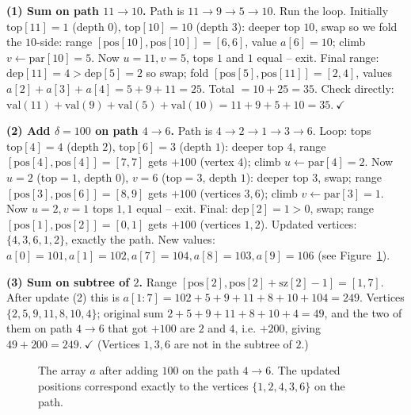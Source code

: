 \begin{labbox}
\textbf{(1) Sum on path $11\to 10$.} Path is $11\!\to\!9\!\to\!5\!\to\!10$. Run the loop. Initially
$\mathrm{top}[11]=1$ (depth $0$), $\mathrm{top}[10]=10$ (depth $3$): deeper top $10$, swap so we fold
the $10$-side: range $[\mathrm{pos}[10],\mathrm{pos}[10]]=[6,6]$, value $a[6]=10$; climb
$v\gets\mathrm{par}[10]=5$. Now $u=11,v=5$, tops $1$ and $1$ equal -- exit. Final range:
$\mathrm{dep}[11]=4>\mathrm{dep}[5]=2$ so swap; fold $[\mathrm{pos}[5],\mathrm{pos}[11]]=[2,4]$,
values $a[2]+a[3]+a[4]=5+9+11=25$. Total $=10+25=35$. Check directly:
$\mathrm{val}(11)+\mathrm{val}(9)+\mathrm{val}(5)+\mathrm{val}(10)=11+9+5+10=35.\ \checkmark$

\textbf{(2) Add $\delta=100$ on path $4\to 6$.} Path is $4\!\to\!2\!\to\!1\!\to\!3\!\to\!6$. Loop:
tops $\mathrm{top}[4]=4$ (depth $2$), $\mathrm{top}[6]=3$ (depth $1$): deeper top $4$, range
$[\mathrm{pos}[4],\mathrm{pos}[4]]=[7,7]$ gets $+100$ (vertex $4$); climb $u\gets\mathrm{par}[4]=2$.
Now $u=2$ ($\mathrm{top}=1$, depth $0$), $v=6$ ($\mathrm{top}=3$, depth $1$): deeper top $3$, swap;
range $[\mathrm{pos}[3],\mathrm{pos}[6]]=[8,9]$ gets $+100$ (vertices $3,6$); climb
$v\gets\mathrm{par}[3]=1$. Now $u=2,v=1$ tops $1,1$ equal -- exit. Final: $\mathrm{dep}[2]=1>0$, swap;
range $[\mathrm{pos}[1],\mathrm{pos}[2]]=[0,1]$ gets $+100$ (vertices $1,2$). Updated vertices:
$\{4,3,6,1,2\}$, exactly the path. New values: $a[0]=101,a[1]=102,a[7]=104,a[8]=103,a[9]=106$ (see Figure~\ref{ch19:fig-updatedarray}).

\textbf{(3) Sum on subtree of $2$.} Range $[\mathrm{pos}[2],\mathrm{pos}[2]+\mathrm{sz}[2]-1]=[1,7]$.
After update (2) this is $a[1{:}7]=102+5+9+11+8+10+104=249$. Vertices $\{2,5,9,11,8,10,4\}$; original
sum $2+5+9+11+8+10+4=49$, and the two of them on path $4\to6$ that got $+100$ are $2$ and $4$, i.e.
$+200$, giving $49+200=249.\ \checkmark$ (Vertices $1,3,6$ are not in the subtree of $2$.)
\end{labbox}

\begin{figure}[htbp]
\centering
{}
\caption{The array $a$ after adding $100$ on the path $4\to 6$. The updated positions correspond exactly to the vertices $\{1, 2, 4, 3, 6\}$ on the path.}
\label{ch19:fig-updatedarray}
\end{figure}

